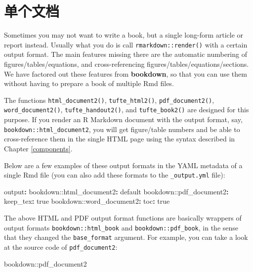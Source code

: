 \documentclass[
  12pt,
]{krantz}
\newenvironment{Shaded}{\begin{snugshade}}{\end{snugshade}}
\newcommand{\AttributeTok}[1]{\textcolor[rgb]{0.77,0.63,0.00}{#1}}
\newcommand{\CharTok}[1]{\textcolor[rgb]{0.31,0.60,0.02}{#1}}
\newcommand{\FunctionTok}[1]{\textcolor[rgb]{0.00,0.00,0.00}{#1}}
\newcommand{\KeywordTok}[1]{\textcolor[rgb]{0.13,0.29,0.53}{\textbf{#1}}}
\newcommand{\NormalTok}[1]{#1}
\newcommand{\SpecialCharTok}[1]{\textcolor[rgb]{0.00,0.00,0.00}{#1}}
\theoremstyle{definition}
\theoremstyle{definition}
\theoremstyle{definition}
\theoremstyle{definition}
\theoremstyle{remark}
\begin{document}
\hypertarget{a-single-document}{%
\section{单个文档}\label{a-single-document}}

Sometimes you may not want to write a book, but a single long-form article or report instead. Usually what you do is call \texttt{rmarkdown::render()} with a certain output format. The main features missing there are the automatic numbering of figures/tables/equations, and cross-referencing figures/tables/equations/sections. We have factored out these features from \textbf{bookdown}, so that you can use them without having to prepare a book of multiple Rmd files.

The functions \texttt{html\_document2()}, \texttt{tufte\_html2()}, \texttt{pdf\_document2()}, \texttt{word\_document2()}, \texttt{tufte\_handout2()}, and \texttt{tufte\_book2()} are designed for this purpose. If you render an R Markdown document with the output format, say, \texttt{bookdown::html\_document2}, you will get figure/table numbers and be able to cross-reference them in the single HTML page using the syntax described in Chapter \ref{components}.

Below are a few examples of these output formats in the YAML metadata of a single Rmd file (you can also add these formats to the \texttt{\_output.yml} file):

\begin{Shaded}
\begin{Highlighting}[]
\FunctionTok{output}\KeywordTok{:}
\AttributeTok{  bookdown:}\FunctionTok{:html\_document2}\KeywordTok{:}\AttributeTok{ default}
\AttributeTok{  bookdown:}\FunctionTok{:pdf\_document2}\KeywordTok{:}
\AttributeTok{    }\FunctionTok{keep\_tex}\KeywordTok{:}\AttributeTok{ }\CharTok{true}
\AttributeTok{  bookdown:}\FunctionTok{:word\_document2}\KeywordTok{:}
\AttributeTok{    }\FunctionTok{toc}\KeywordTok{:}\AttributeTok{ }\CharTok{true}
\end{Highlighting}
\end{Shaded}

The above HTML and PDF output format functions are basically wrappers of output formats \texttt{bookdown::html\_book} and \texttt{bookdown::pdf\_book}, in the sense that they changed the \texttt{base\_format} argument. For example, you can take a look at the source code of \texttt{pdf\_document2}:

\begin{Shaded}
\begin{Highlighting}[]
\NormalTok{bookdown}\SpecialCharTok{::}\NormalTok{pdf\_document2}
\end{Highlighting}
\end{Shaded}
\end{document}
